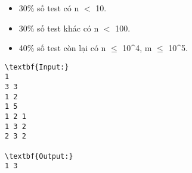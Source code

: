 \begin{itemize}
	\item 30\% số test có n $<$ 10.
	\item 30\% số test khác có n $<$ 100.
	\item 40\% số test còn lại có n  $\le$  10^4, m  $\le$  10^5.
\end{itemize}
\begin{verbatim}
\textbf{Input:}
1
3 3
1 2
1 5
1 2 1
1 3 2
2 3 2

\textbf{Output:}
1 3
\end{verbatim}